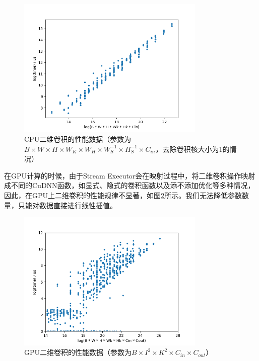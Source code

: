     \begin{figure}[!htbp]
        \centering
        \includegraphics[width=0.8\textwidth]{figures/conv_cpu_fix1.png}
        \caption{CPU二维卷积的性能数据（参数为$ B \times W \times H \times W_K \times W_H \times W_S^{-1} \times H_S^{-1} \times C_{in}  $，去除卷积核大小为1的情况）}
        \label{fig:conv_cpu_fix1}
    \end{figure}

    在GPU计算的时候，由于Stream Executor会在映射过程中，将二维卷积操作映射成不同的CuDNN函数，如显式、隐式的卷积函数以及添不添加优化等多种情况，因此，在GPU上二维卷积的性能规律不显著，如图\ref{fig:conv_gpu}所示。我们无法降低参数数量，只能对数据直接进行线性插值。
    
    \begin{figure}[!htbp]
        \centering
        \includegraphics[width=0.8\textwidth]{figures/conv_gpu.png}
        \caption{GPU二维卷积的性能数据（参数为$ B \times I^2 \times K^2 \times C_{in} \times C_{out} $）}
        \label{fig:conv_gpu}
    \end{figure}
    
